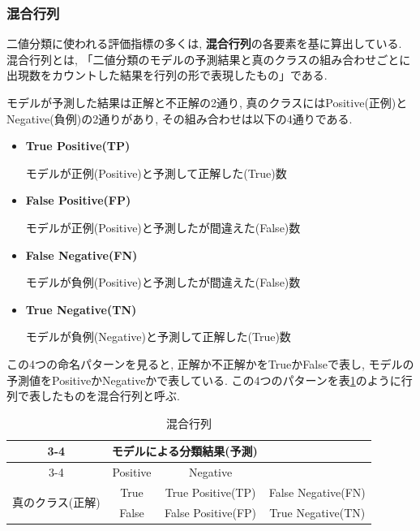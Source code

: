 \documentclass[dvipdfmx]{jsarticle}
\begin{document}
\subsubsection{混合行列}

二値分類に使われる評価指標の多くは, \textbf{混合行列}の各要素を基に算出している.
混合行列とは, 「二値分類のモデルの予測結果と真のクラスの組み合わせごとに出現数をカウントした結果を行列の形で表現したもの」である.

モデルが予測した結果は正解と不正解の2通り, 真のクラスにはPositive(正例)とNegative(負例)の2通りがあり, その組み合わせは以下の4通りである.

\begin{itemize}

    \item \textbf{True Positive(TP)}

    モデルが正例(Positive)と予測して正解した(True)数

    

    \item \textbf{False Positive(FP)}

    モデルが正例(Positive)と予測したが間違えた(False)数

    \item \textbf{False Negative(FN)}

    モデルが負例(Positive)と予測したが間違えた(False)数

    \item \textbf{True Negative(TN)}

    モデルが負例(Negative)と予測して正解した(True)数

\end{itemize}

この4つの命名パターンを見ると, 正解か不正解かをTrueかFalseで表し, モデルの予測値をPositiveかNegativeかで表している.
この4つのパターンを表\ref{mixing matrix}のように行列で表したものを混合行列と呼ぶ.


\begin{table}[H]
    \centering
    \begin{tabular}{|cc|c|c|}
        \cline{3-4}
        \multicolumn{2}{c|}{} & \multicolumn{2}{c|}{モデルによる分類結果(予測)}\\
        \cline{3-4}
        \multicolumn{2}{c|}{} & Positive & Negative \\ 
        \hline
        \multirow{2}{*}{真のクラス(正解)} & \multicolumn{1}{|c|}{True} & True Positive(TP) & False Negative(FN) \\
        \cline{2-4}
         & \multicolumn{1}{|c|}{False} & False Positive(FP) & True Negative(TN)\\ \hline
    \end{tabular}
    \caption{混合行列}
    \label{mixing matrix}
\end{table}
\end{document}

